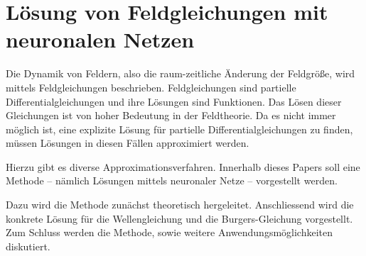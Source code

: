 %
%
%
%
\chapter{Lösung von Feldgleichungen mit neuronalen Netzen\label{chapter:neuronal}}
\begin{refsection}

Die Dynamik von Feldern, also die raum-zeitliche Änderung der Feldgröße, wird mittels Feldgleichungen beschrieben.
Feldgleichungen sind partielle Differentialgleichungen und ihre Lösungen sind Funktionen.
Das Lösen dieser Gleichungen ist von hoher Bedeutung in der Feldtheorie.
Da es nicht immer möglich ist, eine explizite Lösung für partielle Differentialgleichungen zu finden, müssen Lösungen in diesen Fällen approximiert werden.

Hierzu gibt es diverse Approximationsverfahren.
Innerhalb dieses Papers soll eine Methode -- nämlich Lösungen mittels neuronaler Netze -- vorgestellt werden.\newline

Dazu wird die Methode zunächst theoretisch hergeleitet.
Anschliessend wird die konkrete Lösung für die Wellengleichung und die Burgers-Gleichung vorgestellt.
Zum Schluss werden die Methode, sowie weitere Anwendungsmöglichkeiten diskutiert.\newline






\printbibliography[heading=subbibliography]
\end{refsection}
